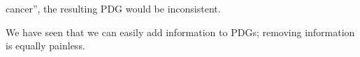 \documentclass{article}
\newcommand\cmergearr[4]{
		\draw[arr,-] (#1) -- (#4) -- (#2);
		\draw[arr, shorten <=0] (#4) -- (#3);
	}
\newcommand\mergearr[3]{
		\coordinate (center-#1#2#3) at (barycentric cs:#1=1,#2=1,#3=1.2);
		\cmergearr{#1}{#2}{#3}{center-#1#2#3}
	}
\theoremstyle{plain}
\theoremstyle{definition}
\newenvironment{example}
	{\pushQED{\qed}\renewcommand{\qedsymbol}{$\triangle$}\examplex}
	{\popQED\endexamplex%
}
\theoremstyle{remark}
\newcommand{\var}[1]{\mathsf{#1}}
\newcommand{\MN}{PDG}
\newcommand{\MNs}{\MN s}
\numberwithin{equation}{section}
\begin{document}
\begin{example}[emulating a BN]
                cancer'', the resulting PDG would be inconsistent.  
%
%			
%	       
	\end{example}	


	We have seen that we can easily add information to \MNs;
removing information is equally painless.   
\end{document}
